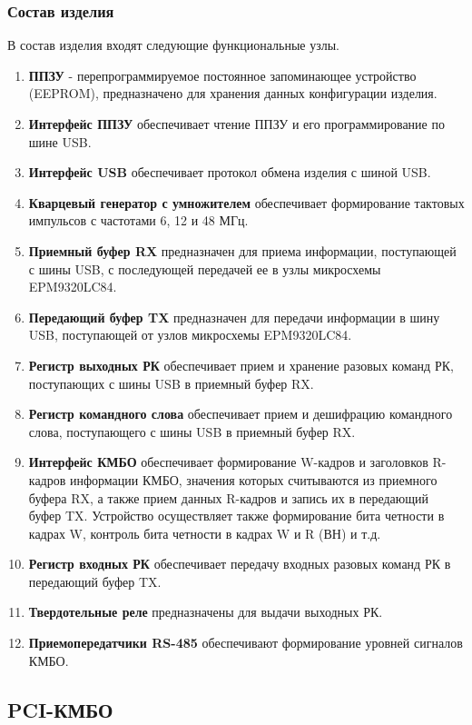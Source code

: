 	\subsubsection{Состав изделия}
	В состав изделия входят следующие функциональные узлы.
	\begin{enumerate}
		\item \textbf{ППЗУ} - перепрограммируемое постоянное запоминающее устройство (EEPROM), предназначено для хранения данных конфигурации изделия.
		\item \textbf{Интерфейс ППЗУ} обеспечивает чтение ППЗУ и его программирование по шине USB.
		\item \textbf{Интерфейс USB} обеспечивает протокол обмена изделия с шиной USB.
		\item \textbf{Кварцевый генератор с умножителем} обеспечивает формирование тактовых импульсов с частотами 6, 12 и 48 МГц.
		\item \textbf{Приемный буфер RX} предназначен для приема информации, поступающей с шины USB, с последующей передачей ее в узлы микросхемы EPM9320LC84.
		\item \textbf{Передающий буфер TX} предназначен для передачи информации в шину USB, поступающей от узлов микросхемы EPM9320LC84.
		\item \textbf{Регистр выходных РК} обеспечивает прием и хранение разовых команд РК, поступающих с шины USB в приемный буфер RX.
		\item \textbf{Регистр командного слова} обеспечивает прием и дешифрацию командного слова, поступающего с шины USB в приемный буфер RX.
		\item \textbf{Интерфейс КМБО} обеспечивает формирование W-кадров и заголовков R-кадров информации КМБО, значения которых считываются из приемного буфера RX, а также прием данных R-кадров и запись их в передающий буфер TX. Устройство осуществляет также формирование бита четности в кадрах W, контроль бита четности в кадрах W и R (ВН) и т.д.
		\item \textbf{Регистр входных РК} обеспечивает передачу входных разовых команд РК в передающий буфер TX.
		\item \textbf{Твердотельные реле} предназначены для выдачи выходных РК.
		\item \textbf{Приемопередатчики RS-485} обеспечивают формирование уровней сигналов КМБО.
	\end{enumerate}

	\subsection{PCI-КМБО}

